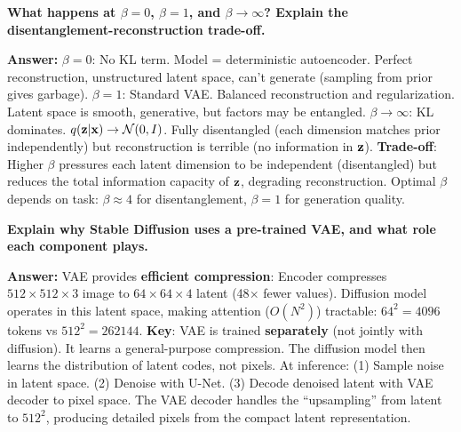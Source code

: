 \begin{examq}
\textbf{What happens at $\beta = 0$, $\beta = 1$, and $\beta \to \infty$? Explain the disentanglement-reconstruction trade-off.}

\textbf{Answer:} \textbf{$\beta = 0$}: No KL term. Model = deterministic autoencoder. Perfect reconstruction, unstructured latent space, can't generate (sampling from prior gives garbage). \textbf{$\beta = 1$}: Standard VAE. Balanced reconstruction and regularization. Latent space is smooth, generative, but factors may be entangled. \textbf{$\beta \to \infty$}: KL dominates. $q(\mathbf{z}|\mathbf{x}) \to \mathcal{N}(0,I)$. Fully disentangled (each dimension matches prior independently) but reconstruction is terrible (no information in $\mathbf{z}$). \textbf{Trade-off}: Higher $\beta$ pressures each latent dimension to be independent (disentangled) but reduces the total information capacity of $\mathbf{z}$, degrading reconstruction. Optimal $\beta$ depends on task: $\beta \approx 4$ for disentanglement, $\beta = 1$ for generation quality.
\end{examq}

\begin{examq}
\textbf{Explain why Stable Diffusion uses a pre-trained VAE, and what role each component plays.}

\textbf{Answer:} VAE provides \textbf{efficient compression}: Encoder compresses $512{\times}512{\times}3$ image to $64{\times}64{\times}4$ latent (48$\times$ fewer values). Diffusion model operates in this latent space, making attention ($O(N^2)$) tractable: $64^2 = 4096$ tokens vs $512^2 = 262144$. \textbf{Key}: VAE is trained \textbf{separately} (not jointly with diffusion). It learns a general-purpose compression. The diffusion model then learns the distribution of latent codes, not pixels. At inference: (1) Sample noise in latent space. (2) Denoise with U-Net. (3) Decode denoised latent with VAE decoder to pixel space. The VAE decoder handles the ``upsampling'' from latent to $512^2$, producing detailed pixels from the compact latent representation.
\end{examq}
